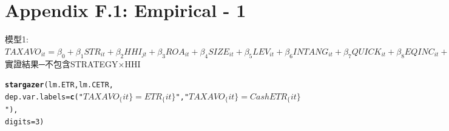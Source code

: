 \documentclass[a4paper,14pt]{article}\usepackage[]{graphicx}\usepackage[]{color}
\makeatletter
\newcommand{\hlnum}[1]{\textcolor[rgb]{0.686,0.059,0.569}{#1}}%
\newcommand{\hlstr}[1]{\textcolor[rgb]{0.192,0.494,0.8}{#1}}%
\newcommand{\hlstd}[1]{\textcolor[rgb]{0.345,0.345,0.345}{#1}}%
\newcommand{\hlkwc}[1]{\textcolor[rgb]{0.333,0.667,0.333}{#1}}%
\newcommand{\hlkwd}[1]{\textcolor[rgb]{0.737,0.353,0.396}{\textbf{#1}}}%
\newenvironment{kframe}{%
 \def\at@end@of@kframe{}%
 \ifinner\ifhmode%
  \def\at@end@of@kframe{\end{minipage}}%
  \begin{minipage}{\columnwidth}%
 \fi\fi%
 \def\FrameCommand##1{\hskip\@totalleftmargin \hskip-\fboxsep
 \colorbox{shadecolor}{##1}\hskip-\fboxsep
     \hskip-\linewidth \hskip-\@totalleftmargin \hskip\columnwidth}%
 \MakeFramed {\advance\hsize-\width
   \@totalleftmargin\z@ \linewidth\hsize
   \@setminipage}}%
 {\par\unskip\endMakeFramed%
 \at@end@of@kframe}
\makeatother
\begin{document}
\section{\\Appendix F.1: Empirical - 1} \label{App:Appendix F.1}
模型1:\\
$TAXAVO_{it}=\beta_{0}+\beta_{1}STR_{it}+\beta_{2}HHI_{jt}+\beta_{3}ROA_{it}+\beta_{4}SIZE_{it}+\beta_{5}LEV_{it}+\beta_{6}INTANG_{it}+\beta_{7}QUICK_{it}+\beta_{8}EQINC_{it}+\beta_{9}OUTINSTI_{it}+\beta_{10}RELAT_{it}+\beta_{11}FAMILY_{it}+\beta_{12}GDP_{it}+\varepsilon_{13}$\\
實證結果─不包含STRATEGY×HHI\\
\begin{kframe}
\begin{alltt}
  \hlkwd{stargazer}\hlstd{(lm.ETR,lm.CETR,}
    \hlkwc{dep.var.labels} \hlstd{=} \hlkwd{c}\hlstd{(}\hlstr{"$TAXAVO_\{it\}=ETR_\{it\}$"}\hlstd{,}\hlstr{"$TAXAVO_\{it\}=CashETR_\{it\}$"}\hlstd{),}
    \hlkwc{digits}\hlstd{=}\hlnum{3}\hlstd{)}
\end{alltt}
\end{kframe}
\end{document}
